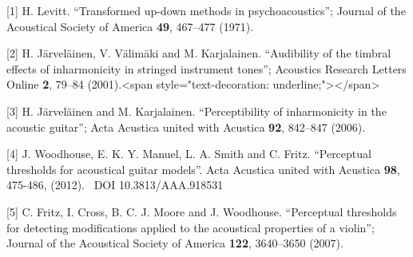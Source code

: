  \sectionreferences{}[1] H. Levitt. ``Transformed up-down methods in 
  psychoacoustics''; Journal of the Acoustical Society of America \textbf{49}, 
  467--477 (1971). 

  [2] H. Järveläinen, V. Välimäki and M. Karjalainen. ``Audibility of the 
  timbral effects of inharmonicity in stringed instrument tones''; Acoustics 
  Research Letters Online \textbf{2}, 79--84 (2001).<span 
  style="text-decoration: underline;"></span> 

  [3] H. Järveläinen and M. Karjalainen. ``Perceptibility of inharmonicity in 
  the acoustic guitar''; Acta Acustica united with Acustica \textbf{92}, 
  842–847 (2006). 

  [4] J. Woodhouse, E. K. Y. Manuel, L. A. Smith and C. Fritz. ``Perceptual 
  thresholds for acoustical guitar models''. Acta Acustica united with Acustica 
  \textbf{98}, 475-486, (2012).~ DOI 10.3813/AAA.918531 

  [5] C. Fritz, I. Cross, B. C. J. Moore and J. Woodhouse. ``Perceptual 
  thresholds for detecting modifications applied to the acoustical properties 
  of a violin''; Journal of the Acoustical Society of America \textbf{122}, 
  3640–3650 (2007). 